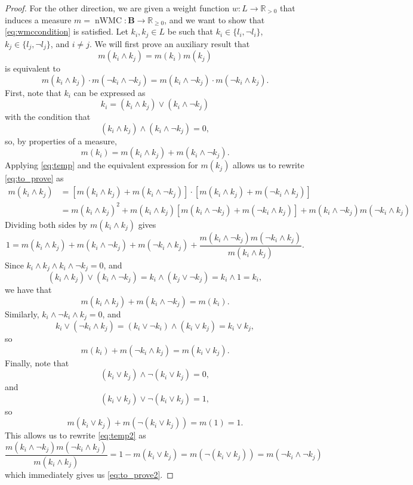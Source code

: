 \documentclass{article}
\theoremstyle{definition}
\theoremstyle{remark}
\DeclareMathOperator{\nWMC}{nWMC}
\begin{document}
\begin{proof}
  For the other direction, we are given a weight function $w : L \to
  \mathbb{R}_{>0}$ that induces a measure $m = \nWMC : \mathbf{B} \to
  \mathbb{R}_{\ge 0}$, and we want to show that \cref{eq:wmccondition} is
  satisfied. Let $k_i, k_j \in L$ be such that $k_i \in \{ l_i, \neg l_i \}$,
  $k_j \in \{ l_j, \neg l_j \}$, and $i \ne j$. We will first prove an auxiliary
  result that
  \begin{equation} \label{eq:to_prove}
    m(k_i \land k_j) = m(k_i)m(k_j)
  \end{equation}
  is equivalent to
  \begin{equation} \label{eq:to_prove2}
    m(k_i \land k_j) \cdot m(\neg k_i \land \neg k_j) = m(k_i \land \neg k_j)
    \cdot m(\neg k_i \land k_j).
  \end{equation}
  First, note that $k_i$ can be expressed as
  \[
    k_i = (k_i \land k_j) \lor (k_i \land \neg k_j)
  \]
  with the condition that
  \[
    (k_i \land k_j) \land (k_i \land \neg k_j) = 0,
  \]
  so, by properties of a measure,
  \begin{equation} \label{eq:temp}
    m(k_i) = m(k_i \land k_j) + m(k_i \land \neg k_j).
  \end{equation}
  Applying \cref{eq:temp} and the equivalent expression for $m(k_j)$ allows us
  to rewrite \cref{eq:to_prove} as
  \begin{align*}
    m(k_i \land k_j) &= [m(k_i \land k_j) + m(k_i \land \neg k_j)] \cdot [m(k_i \land k_j) + m(\neg k_i \land k_j)] \\
                     &= m(k_i \land k_j)^2 + m(k_i \land k_j)[m(k_i \land \neg k_j) + m(\neg k_i \land k_j)] + m(k_i \land \neg k_j)m(\neg k_i \land k_j)
  \end{align*}
  Dividing both sides by $m(k_i \land k_j)$ gives
  \begin{equation} \label{eq:temp2}
    1 = m(k_i \land k_j) + m(k_i \land \neg k_j) + m(\neg k_i \land k_j) +
    \frac{m(k_i \land \neg k_j)m(\neg k_i \land k_j)}{m(k_i \land k_j)}.
  \end{equation}
  Since $k_i \land k_j \land k_i \land \neg k_j = 0$, and
  \[
    (k_i \land k_j) \lor (k_i \land \neg k_j) = k_i \land (k_j \lor \neg k_j) =
    k_i \land 1 = k_i,
  \]
  we have that
  \[
    m(k_i \land k_j) + m(k_i \land \neg k_j) = m(k_i).
  \]
  Similarly, $k_i \land \neg k_i \land k_j = 0$, and
  \[
    k_i \lor (\neg k_i \land k_j) = (k_i \lor \neg k_i) \land (k_i \lor k_j) =
    k_i \lor k_j,
  \]
  so
  \[
    m(k_i) + m(\neg k_i \land k_j) = m(k_i \lor k_j).
  \]
  Finally, note that
  \[
    (k_i \lor k_j) \land \neg(k_i \lor k_j) = 0,
  \]
  and
  \[
    (k_i \lor k_j) \lor \neg(k_i \lor k_j) = 1,
  \]
  so
  \[
    m(k_i \lor k_j) + m(\neg(k_i \lor k_j)) = m(1) = 1.
  \]
  This allows us to rewrite \cref{eq:temp2} as
  \[
    \frac{m(k_i \land \neg k_j)m(\neg k_i \land k_j)}{m(k_i \land k_j)} = 1 -
    m(k_i \lor k_j) = m(\neg(k_i \lor k_j)) = m(\neg k_i \land \neg k_j)
  \]
  which immediately gives us \cref{eq:to_prove2}.


\end{proof}
\end{document}
